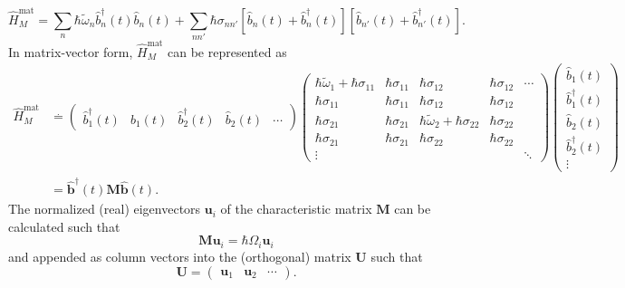 \documentclass{article}
\begin{document}
\begin{equation}
\hat{H}_M^\mathrm{mat} = \sum_{n}\hbar\tilde{\omega}_n\hat{b}_n^\dagger(t)\hat{b}_n(t) + \sum_{nn'}\hbar\sigma_{nn'}\left[\hat{b}_n(t) + \hat{b}_n^\dagger(t)\right]\left[\hat{b}_{n'}(t) + \hat{b}_{n'}^\dagger(t)\right].
\end{equation}
In matrix-vector form, $\hat{H}_M^\mathrm{mat}$ can be represented as
\begin{equation}
\begin{split}
\hat{H}_M^\mathrm{mat} &\overset{.}{=}
\begin{pmatrix}
\hat{b}_1^\dagger(t) & \hat{b}_1(t) & \hat{b}_2^\dagger(t) & \hat{b}_2(t) & \cdots
\end{pmatrix}
\begin{pmatrix}
\hbar\tilde{\omega}_1 + \hbar\sigma_{11} & \hbar\sigma_{11} & \hbar\sigma_{12} & \hbar\sigma_{12} & \cdots\\
\hbar\sigma_{11} & \hbar\sigma_{11} & \hbar\sigma_{12} & \hbar\sigma_{12} &\\
\hbar\sigma_{21} & \hbar\sigma_{21} & \hbar\tilde{\omega}_2 + \hbar\sigma_{22} & \hbar\sigma_{22} & \\
\hbar\sigma_{21} & \hbar\sigma_{21} & \hbar\sigma_{22} & \hbar\sigma_{22} & \\
\vdots & & & & \ddots
\end{pmatrix}
\begin{pmatrix}
\hat{b}_1(t)\\
\hat{b}_1^\dagger(t)\\
\hat{b}_2(t)\\
\hat{b}_2^\dagger(t)\\
\vdots
\end{pmatrix}\\
&= \hat{\mathbf{b}}^\dagger(t)\mathbf{M}\hat{\mathbf{b}}(t).
\end{split}
\end{equation}
The normalized (real) eigenvectors $\mathbf{u}_i$ of the characteristic matrix $\mathbf{M}$ can be calculated such that
\begin{equation}
\mathbf{M}\mathbf{u}_i = \hbar\Omega_i\mathbf{u}_i
\end{equation}
and appended as column vectors into the (orthogonal) matrix $\mathbf{U}$ such that
\begin{equation}
\mathbf{U} = 
\begin{pmatrix}
\mathbf{u}_1 & \mathbf{u}_2 & \cdots
\end{pmatrix}.
\end{equation}
\end{document}
